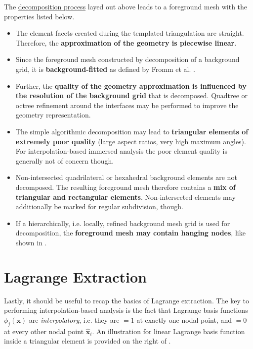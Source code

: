 \vspace{0.5cm}

The \hyperlink{decomposition}{decomposition process} layed out above leads to a foreground mesh with the \hypertarget{foreground_mesh_properties}{properties} listed below.
\begin{itemize}
    \item The element facets created during the templated triangulation are straight. Therefore, the \textbf{approximation of the geometry is piecewise linear}.
    
    \item Since the foreground mesh constructed by decomposition of a background grid, it is \textbf{background-fitted} as defined by Fromm et al. \cite{Fromm2022}.
    
    \item Further, the \textbf{quality of the geometry approximation is influenced by the resolution of the background grid} that is decomposed. Quadtree or octree refinement around the interfaces may be performed to improve the geometry representation.
    
    \item The simple algorithmic decomposition may lead to \textbf{triangular elements of extremely poor quality} (large aspect ratios, very high maximum angles). For interpolation-based immersed analysis the poor element quality is generally not of concern though.

    \item Non-intersected quadrilateral or hexahedral background elements are not decomposed. The resulting foreground mesh therefore contains a \textbf{mix of triangular and rectangular elements}. Non-intersected elements may additionally be marked for regular subdivision, though.

    \item If a hierarchically, i.e. locally, refined background mesh grid is used for decomposition, the \textbf{foreground mesh may contain hanging nodes}, like shown in .
\end{itemize}

\section{Lagrange Extraction}
\label{sec:overview_extraction}

Lastly, it should be useful to recap the basics of Lagrange extraction. 
The key to performing interpolation-based analysis is the fact that Lagrange basis functions $\phi_j(\bm{x})$ are \emph{interpolatory}, i.e. they are $=1$ at exactly one nodal point, and $=0$ at every other nodal point $\hat{\bm{x}}_i$. An illustration for linear Lagrange basis function inside a triangular element is provided on the right of .

